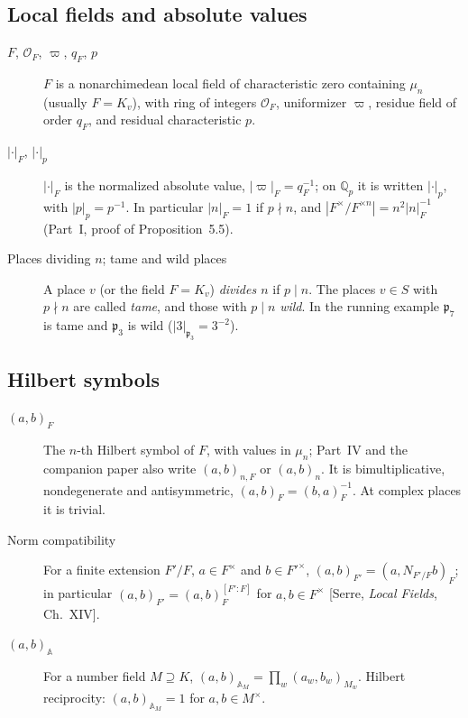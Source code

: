\subsection{Local fields and absolute values}\label{gl:local}
\begin{description}
\item[$F$, $\mathcal O_F$, $\varpi$, $q_F$, $p$] $F$ is a
nonarchimedean local field of characteristic zero containing $\mu_n$
(usually $F=K_v$), with ring of integers $\mathcal O_F$, uniformizer
$\varpi$, residue field of order $q_F$, and residual characteristic
$p$.
\item[$|\cdot|_F$, $|\cdot|_p$] $|\cdot|_F$ is the normalized absolute
value, $|\varpi|_F=q_F^{-1}$; on $\mathbb Q_p$ it is written
$|\cdot|_p$, with $|p|_p=p^{-1}$.  In particular $|n|_F=1$ if
$p\nmid n$, and $|F^\times/F^{\times n}|=n^2|n|_F^{-1}$ (Part~I,
proof of Proposition~5.5).
\item[Places dividing $n$; tame and wild places] A place $v$ (or the
field $F=K_v$) \emph{divides $n$} if $p\mid n$.  The places $v\in S$
with $p\nmid n$ are called \emph{tame}, and those with $p\mid n$
\emph{wild}.  In the running example $\mathfrak p_7$ is tame and
$\mathfrak p_3$ is wild ($|3|_{\mathfrak p_3}=3^{-2}$).
\end{description}

\subsection{Hilbert symbols}\label{gl:hilbert}
\begin{description}
\item[$(a,b)_F$] The $n$-th Hilbert symbol of $F$, with values in
$\mu_n$; Part~IV and the companion paper also write $(a,b)_{n,F}$ or
$(a,b)_n$.  It is bimultiplicative, nondegenerate and antisymmetric,
$(a,b)_F=(b,a)_F^{-1}$.  At complex places it is trivial.
\item[Norm compatibility] For a finite extension $F'/F$, $a\in
F^\times$ and $b\in F'^\times$, $(a,b)_{F'}=(a,N_{F'/F}b)_F$; in
particular $(a,b)_{F'}=(a,b)_F^{[F':F]}$ for $a,b\in F^\times$
[Serre, \emph{Local Fields}, Ch.~XIV].
\item[$(a,b)_{\mathbb A}$] For a number field $M\supseteq K$,
$(a,b)_{\mathbb A_M}=\prod_w(a_w,b_w)_{M_w}$.  Hilbert reciprocity:
$(a,b)_{\mathbb A_M}=1$ for $a,b\in M^\times$.
\end{description}

